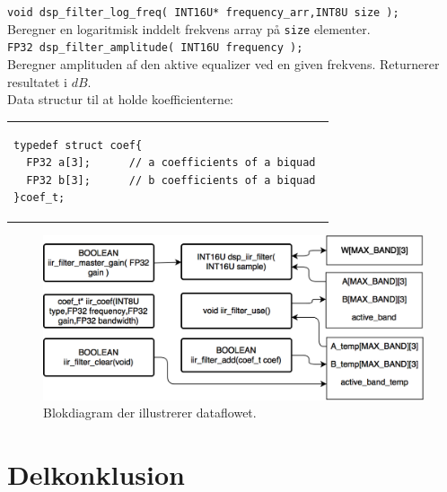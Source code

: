 \texttt{void dsp\_filter\_log\_freq( INT16U* frequency\_arr,INT8U size );} \\ 
Beregner en logaritmisk inddelt frekvens array på \texttt{size} elementer. \\

\texttt{FP32 dsp\_filter\_amplitude( INT16U frequency );}\\
Beregner amplituden af den aktive equalizer ved en given frekvens. Returnerer resultatet i $dB$. \\

Data structur til at holde koefficienterne:\\
\begin{tabular}{l}
\begin{lstlisting}
typedef struct coef{
  FP32 a[3];      // a coefficients of a biquad
  FP32 b[3];      // b coefficients of a biquad 
}coef_t;
\end{lstlisting}
\end{tabular}



\begin{figure}[ht]
\centering
\includegraphics[scale = 0.3]{billeder/finalflow_dsp}
\caption{Blokdiagram der illustrerer dataflowet.}
\label{fig:data_flow_imp}
 \end{figure}



\section{Delkonklusion}






